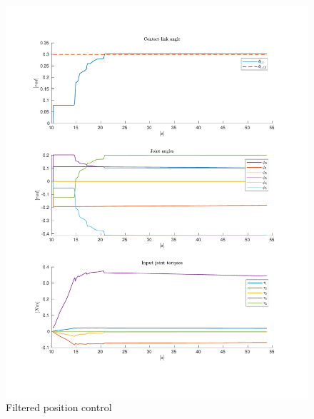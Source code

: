 \begin{figure}
    \centering
    
    \includegraphics[trim=2cm 2cm 2cm 2cm, clip=true, width=\textwidth]{figures/experiments/single_pos/single-pos-3plot.pdf}

    \caption{Filtered position control}
    \label{fig:singlepos}
\end{figure}

